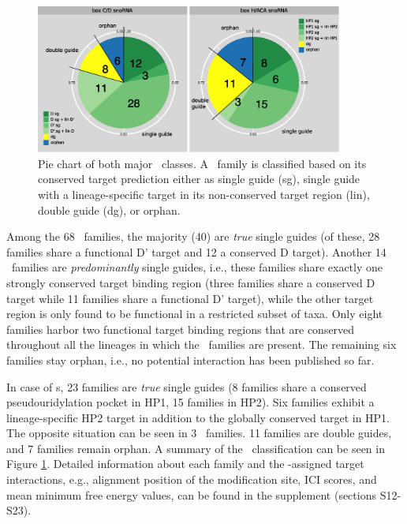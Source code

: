 \begin{figure}
  \centering
  \includegraphics[width=0.9\textwidth]{pics/pieCharts_snoRNAs_modified.eps}
  \caption[Classification of \sno\ families as single or double
  guides.]{Pie chart of both major \sno\ classes. A \sno\ family is
    classified based on its conserved target prediction either as
    single guide (sg), single guide with a lineage-specific target in
    its non-conserved target region (lin), double guide (dg), or
    orphan.}
  \label{fig:pie_charts}
\end{figure}

Among the 68 \cd\ families, the majority (40) are \textit{true} single
guides  (of these, 28 families share a functional D' target
and 12 a conserved D target). Another 14 \cd\ families are
\textit{predominantly} single guides, i.e., these families share
exactly one strongly conserved target binding region (three families
share a conserved D target while 11 families share a functional D'
target), while the other target region is only found to be functional
in a restricted subset of taxa. Only eight families harbor two
functional target binding regions that are conserved throughout all
the lineages in which the \sno\ families are present. The remaining
six families stay orphan, i.e., no potential interaction has been
published so far.

In case of {\haca}s, 23 families are \textit{true} single guides (8
families share a conserved pseudouridylation pocket in HP1, 15
families in HP2). Six families exhibit a lineage-specific HP2 target
in addition to the globally conserved target in HP1. The opposite situation
can be seen in 3 \haca\ families. 11 families are double guides, and 7
families remain orphan. A summary of the \sno\ classification can be seen in
Figure \ref{fig:pie_charts}.  Detailed information about each family and
the \snostrip-assigned target interactions, e.g., alignment position of the
modification site, ICI scores, and mean minimum free energy values, can be
found in the supplement (sections S12-S23).

